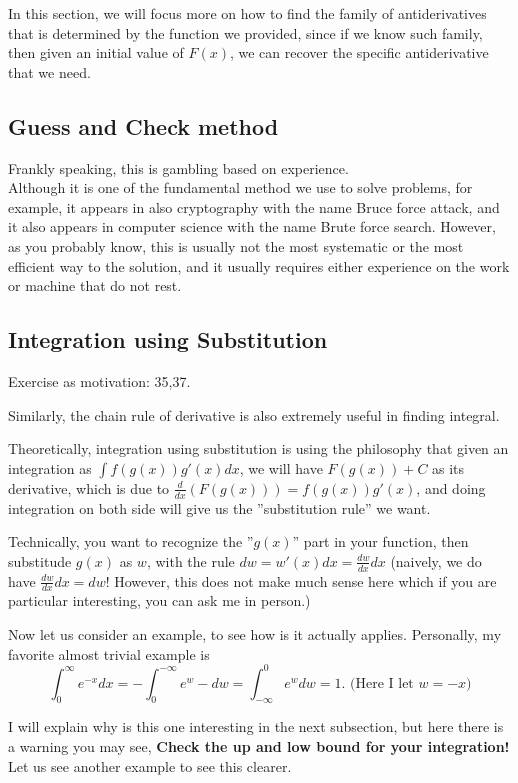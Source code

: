 \documentclass[12pt]{article}
\theoremstyle{definition}
\theoremstyle{definition}
\theoremstyle{remark}
\theoremstyle{definition}
\theoremstyle{definition}
\theoremstyle{definition}
\begin{document}
In this section, we will focus more on how to find the family of antiderivatives that is determined by the function we provided, since if we know such family, then given an initial value of $F(x)$, we can recover the specific antiderivative that we need.

\subsection{Guess and Check method}

Frankly speaking, this is gambling based on experience.\\
Although it is one of the fundamental method we use to solve problems, for example, it appears in also cryptography with the name Bruce force attack, and it also appears in computer science with the name Brute force search. However, as you probably know, this is usually not the most systematic or the most efficient way to the solution, and it usually requires either experience on the work or machine that do not rest. 

\subsection{Integration using Substitution}
Exercise as motivation:  35,37.

Similarly, the chain rule of derivative is also extremely useful in finding integral.

Theoretically, integration using substitution is using the philosophy that given an integration as $\int f(g(x)) g'(x) dx$, we will have $F(g(x))+C$ as its derivative, which is due to $\frac{d}{dx}(F(g(x))) = f(g(x))g'(x)$, and doing integration on both side will give us the ''substitution rule'' we want.

Technically, you want to recognize the ''$g(x)$'' part in your function, then substitude $g(x)$ as $w$, with the rule $dw=w'(x)dx =\frac{dw}{dx} dx$ (naively, we do have $\frac{dw}{dx} dx =dw$! However, this does not make much sense here which if you are particular interesting, you can ask me in person.)

Now let us consider an example, to see how is it actually applies.
Personally, my favorite almost trivial example is \[\int^{\infty}_0 e^{-x}dx=-\int_{0}^{-\infty}e^w -dw=\int^{0}_{-\infty}e^w dw=1.\text{ (Here I let }w=-x)\]

I will explain why is this one interesting in the next subsection, but here there is a warning you may see, \textbf{Check the up and low bound for your integration!} Let us see another example to see this clearer.
\end{document}
